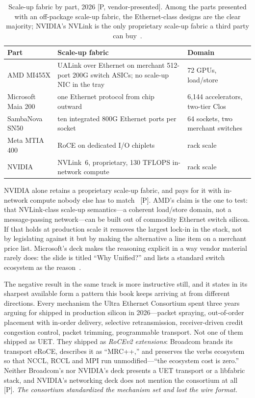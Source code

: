 \begin{table}[htbp]
  \centering
  \small
  \caption{Scale-up fabric by part, 2026 [P, vendor-presented]. Among the parts presented with an off-package scale-up fabric, the Ethernet-class designs are the clear majority; NVIDIA's NVLink is the only proprietary scale-up fabric a third party can buy~\cite{hc2026-scaleup}.}
  \label{tab:scaleup}
  \setlength{\tabcolsep}{4pt}
  \begin{tabular}{p{24mm}p{50mm}p{42mm}}
    \toprule
    Part & Scale-up fabric & Domain \\
    \midrule
    AMD MI455X & UALink over Ethernet on merchant 512-port 200G switch ASICs; no scale-up NIC in the tray & 72 GPUs, load/store \\
    \addlinespace
    Microsoft Maia 200 & one Ethernet protocol from chip outward & 6,144 accelerators, two-tier Clos \\
    \addlinespace
    SambaNova SN50 & ten integrated 800G Ethernet ports per socket & 64 sockets, two merchant switches \\
    \addlinespace
    Meta MTIA 400 & RoCE on dedicated I/O chiplets & rack scale \\
    \addlinespace
    NVIDIA & NVLink~6, proprietary, 130 TFLOPS in-network compute & rack scale \\
    \bottomrule
  \end{tabular}
\end{table}

NVIDIA alone retains a proprietary scale-up fabric, and pays for it with in-network compute nobody else has to match~\cite{hc2026-scaleup} [P]. AMD's claim is the one to test: that NVLink-class scale-up semantics---a coherent load/store domain, not a message-passing network---can be built out of commodity Ethernet switch silicon. If that holds at production scale it removes the largest lock-in in the stack, not by legislating against it but by making the alternative a line item on a merchant price list. Microsoft's deck makes the reasoning explicit in a way vendor material rarely does: the slide is titled ``Why Unified?'' and lists a standard switch ecosystem as the reason~\cite{hc2026-scaleup}.

The negative result in the same track is more instructive still, and it states in its sharpest available form a pattern this book keeps arriving at from different directions. Every mechanism the Ultra Ethernet Consortium spent three years arguing for shipped in production silicon in 2026---packet spraying, out-of-order placement with in-order delivery, selective retransmission, receiver-driven credit congestion control, packet trimming, programmable transport. Not one of them shipped as UET. They shipped as \emph{RoCEv2 extensions}: Broadcom brands its transport eRoCE, describes it as ``MRC++,'' and preserves the verbs ecosystem so that NCCL, RCCL and MPI run unmodified---``the ecosystem cost is zero.'' Neither Broadcom's nor NVIDIA's deck presents a UET transport or a libfabric stack, and NVIDIA's networking deck does not mention the consortium at all~\cite{hc2026-uec} [P]. \emph{The consortium standardized the mechanism set and lost the wire format.}

